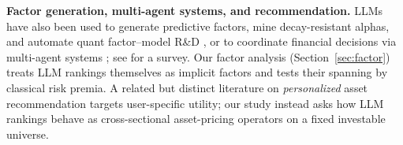 \textbf{Factor generation, multi-agent systems, and recommendation.}
LLMs have also been used to generate predictive factors, mine decay-resistant alphas, and automate quant factor--model R\&D \citep{cheng2024chatgptfactor,tang2025alphaagent,li2025rdagent}, or to coordinate financial decisions via multi-agent systems \citep{lyu2025alphaagents,cheng2024aapm,yang2024finrobot}; see \citet{nie2024surveylargelanguagemodels} for a survey.
Our factor analysis (Section~\ref{sec:factor}) treats LLM rankings themselves as implicit factors and tests their spanning by classical risk premia.
A related but distinct literature on \emph{personalized} asset recommendation \citep{chung2025mvecf,lee2024pfotgnrec,sanzcruzado2024fartrans,sakurai2026rura} targets user-specific utility; our study instead asks how LLM rankings behave as cross-sectional asset-pricing operators on a fixed investable universe.

